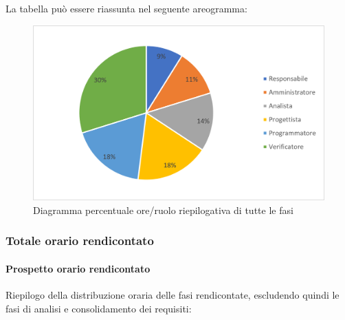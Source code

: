 La tabella può essere riassunta nel seguente areogramma:
\begin{figure}[H]
	\centering
	\includegraphics[width=0.8\linewidth]{res/images/preventivo/tot2.png}
	\caption{Diagramma percentuale ore/ruolo riepilogativa di tutte le fasi}
	\label{fig:diagramma costi ruolo riepilogativa di tutte le fasi}
\end{figure}

\subsubsection{Totale orario rendicontato}
\paragraph{Prospetto orario rendicontato}
Riepilogo della distribuzione oraria delle fasi rendicontate, escludendo quindi le fasi di
analisi e consolidamento dei requisiti:

